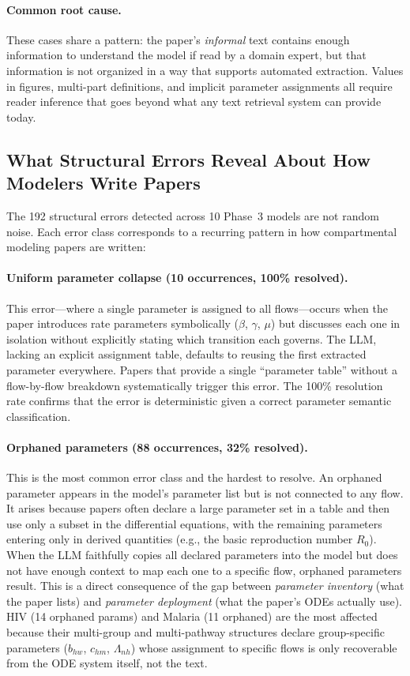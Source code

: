 \paragraph{Common root cause.}
These cases share a pattern: the paper's \emph{informal} text contains enough information
to understand the model if read by a domain expert, but that information is not organized
in a way that supports automated extraction. Values in figures, multi-part definitions,
and implicit parameter assignments all require reader inference that goes beyond what any
text retrieval system can provide today.

\subsection{What Structural Errors Reveal About How Modelers Write Papers}

The 192 structural errors detected across 10 Phase~3 models are not random noise.
Each error class corresponds to a recurring pattern in how compartmental modeling
papers are written:

\paragraph{Uniform parameter collapse (10 occurrences, 100\% resolved).}
This error---where a single parameter is assigned to all flows---occurs when the paper
introduces rate parameters symbolically ($\beta$, $\gamma$, $\mu$) but discusses each
one in isolation without explicitly stating which transition each governs. The LLM,
lacking an explicit assignment table, defaults to reusing the first extracted parameter
everywhere. Papers that provide a single ``parameter table'' without a flow-by-flow
breakdown systematically trigger this error. The 100\% resolution rate confirms that
the error is deterministic given a correct parameter semantic classification.

\paragraph{Orphaned parameters (88 occurrences, 32\% resolved).}
This is the most common error class and the hardest to resolve. An orphaned parameter
appears in the model's parameter list but is not connected to any flow. It arises
because papers often declare a large parameter set in a table and then use only a
subset in the differential equations, with the remaining parameters entering only in
derived quantities (e.g., the basic reproduction number $R_0$). When the LLM faithfully
copies all declared parameters into the model but does not have enough context to map
each one to a specific flow, orphaned parameters result. This is a direct consequence
of the gap between \emph{parameter inventory} (what the paper lists) and \emph{parameter
deployment} (what the paper's ODEs actually use). HIV (14 orphaned params) and Malaria
(11 orphaned) are the most affected because their multi-group and multi-pathway structures
declare group-specific parameters ($b_{hw}$, $c_{hm}$, $\Lambda_{nh}$) whose assignment
to specific flows is only recoverable from the ODE system itself, not the text.

